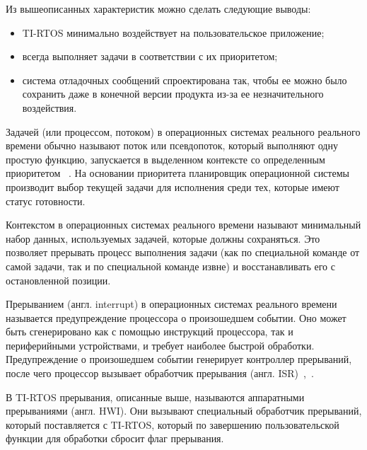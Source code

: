 Из вышеописанных характеристик можно сделать следующие выводы:
\begin{itemize}
    \item TI-RTOS минимально воздействует на пользовательское приложение;
    \item всегда выполняет задачи в соответствии с их приоритетом;
    \item система отладочных сообщений спроектирована так, чтобы ее можно было
        сохранить даже в конечной версии продукта из-за ее незначительного воздействия.
\end{itemize}

Задачей (или процессом, потоком) в операционных системах реального реального времени
обычно называют поток или псевдопоток, который выполняют одну
простую функцию, запускается в выделенном контексте со определенным приоритетом
~\cite{ma_tirtos_kernel}.
На основании приоритета планировщик операционной системы производит выбор текущей
задачи для исполнения среди тех, которые имеют статус готовности.

Контекстом в операционных системах реального времени называют минимальный набор
данных, используемых задачей, которые должны сохраняться. Это позволяет прерывать
процесс выполнения задачи (как по специальной команде от самой задачи,
так и по специальной команде извне) и восстанавливать его
с остановленной позиции.%

Прерыванием (англ. interrupt) в операционных системах реального времени
называется предупреждение процессора о произошедшем событии. Оно может быть
сгенерировано как с помощью инструкций процессора, так и периферийными устройствами,
 и требует наиболее быстрой обработки.
Предупреждение о произошедшем событии генерирует контроллер прерываний,
после чего процессор вызывает обработчик прерывания
(англ. ISR)~\cite{rtos_valvano},~\cite{ma_tirtos_kernel}.


В TI-RTOS прерывания, описанные выше, называются аппаратными прерываниями (англ. HWI).
Они вызывают специальный обработчик прерываний, который поставляется с TI-RTOS,
который по завершению пользовательской функции для обработки сбросит флаг прерывания.

